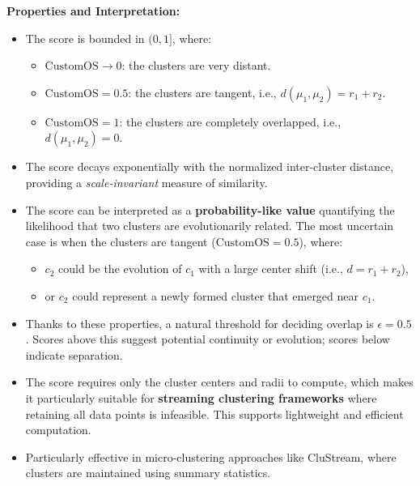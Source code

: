 \textbf{Properties and Interpretation:}
\begin{itemize}
      \item The score is bounded in $ (0, 1] $, where:
            \begin{itemize}
                  \item $ \text{CustomOS} \to 0 $: the clusters are very distant.
                  \item $ \text{CustomOS} = 0.5 $: the clusters are tangent, i.e., $ d(\mu_1, \mu_2) = r_1 + r_2 $.
                  \item $ \text{CustomOS} = 1 $: the clusters are completely overlapped, i.e., $ d(\mu_1, \mu_2) = 0 $.
            \end{itemize}

      \item The score decays exponentially with the normalized inter-cluster distance,
            providing a \textit{scale-invariant} measure of similarity.

      \item The score can be interpreted as a \textbf{probability-like value} quantifying
            the likelihood that two clusters are evolutionarily related. The most uncertain
            case is when the clusters are tangent ($ \text{CustomOS} = 0.5 $), where:
            \begin{itemize}
                  \item $ c_2 $ could be the evolution of $ c_1 $ with a large center shift (i.e., $ d = r_1 + r_2 $),
                  \item or $ c_2 $ could represent a newly formed cluster that emerged near $ c_1 $.
            \end{itemize}

      \item Thanks to these properties, a natural threshold for deciding overlap is $
                  \epsilon = 0.5 $. Scores above this suggest potential continuity or evolution;
            scores below indicate separation.

      \item The score requires only the cluster centers and radii to compute, which makes
            it particularly suitable for \textbf{streaming clustering frameworks} where
            retaining all data points is infeasible. This supports lightweight and
            efficient computation.

      \item Particularly effective in micro-clustering approaches like CluStream, where
            clusters are maintained using summary statistics.
\end{itemize}

